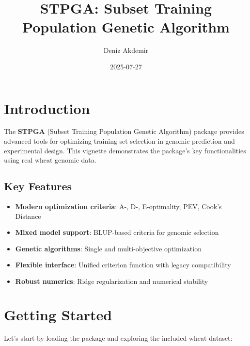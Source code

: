 \documentclass[
]{article}
\title{STPGA: Subset Training Population Genetic Algorithm}
\author{Deniz Akdemir}
\date{2025-07-27}
\providecommand{\tightlist}{%
  \setlength{\itemsep}{0pt}\setlength{\parskip}{0pt}}
\begin{document}
\maketitle

\section{Introduction}\label{introduction}

The \textbf{STPGA} (Subset Training Population Genetic Algorithm)
package provides advanced tools for optimizing training set selection in
genomic prediction and experimental design. This vignette demonstrates
the package's key functionalities using real wheat genomic data.

\subsection{Key Features}\label{key-features}

\begin{itemize}
\tightlist
\item
  \textbf{Modern optimization criteria}: A-, D-, E-optimality, PEV,
  Cook's Distance
\item
  \textbf{Mixed model support}: BLUP-based criteria for genomic
  selection
\item
  \textbf{Genetic algorithms}: Single and multi-objective optimization
\item
  \textbf{Flexible interface}: Unified criterion function with legacy
  compatibility
\item
  \textbf{Robust numerics}: Ridge regularization and numerical stability
\end{itemize}

\section{Getting Started}\label{getting-started}

Let's start by loading the package and exploring the included wheat
dataset:
\end{document}
